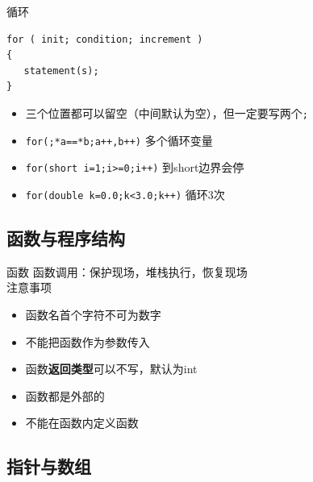 \documentclass{myslide}
\begin{document}
\begin{frame}[fragile]{循环}
\begin{lstlisting}
for ( init; condition; increment )
{
   statement(s);
}
\end{lstlisting}
\begin{itemize}
	\item 三个位置都可以留空（中间默认为空），但一定要写两个\verb';'
	\item \verb'for(;*a==*b;a++,b++)' 多个循环变量
	\item \verb'for(short i=1;i>=0;i++)' 到short边界会停
	\item \verb'for(double k=0.0;k<3.0;k++)' 循环3次
\end{itemize}
\end{frame}

\subsection{函数与程序结构}
\begin{frame}
\subsectionpage
\end{frame}

\begin{frame}{函数}
函数调用：保护现场，堆栈执行，恢复现场\\
注意事项
\begin{itemize}[<+->]
	\item 函数名首个字符不可为数字
	\item 不能把函数作为参数传入
	\item 函数\textbf{返回类型}可以不写，默认为int
	\item 函数都是外部的
	\item 不能在函数内定义函数
\end{itemize}
\end{frame}

\subsection{指针与数组}
\begin{frame}
\subsectionpage
\end{frame}
\end{document}
